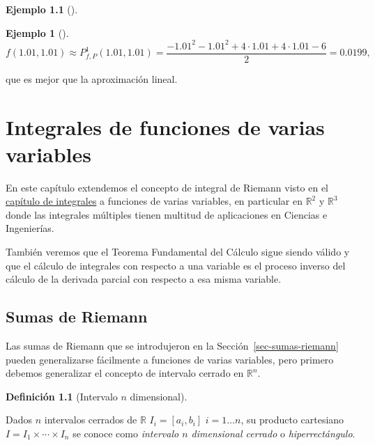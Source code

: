 \documentclass[
  a4paper,
]{scrreport}
\theoremstyle{definition}
\newtheorem{example}{Ejemplo}[chapter]
\theoremstyle{plain}
\theoremstyle{definition}
\newtheorem{definition}{Definición}[chapter]
\theoremstyle{definition}
\theoremstyle{plain}
\theoremstyle{plain}
\theoremstyle{remark}
\begin{document}
\begin{example}[]
\begin{example}[]
\[
f(1.01,1.01) \approx P^1_{f,P}(1.01,1.01) = \frac{-1.01^2-1.01^2+4\cdot 1.01+4\cdot 1.01-6}{2} = 0.0199,
\]

que es mejor que la aproximación lineal.

\end{example}


\chapter{Integrales de funciones de varias
variables}\label{integrales-de-funciones-de-varias-variables}

En este capítulo extendemos el concepto de integral de Riemann visto en
el \href{09-integrales.qmd}{capítulo de integrales} a funciones de
varias variables, en particular en \(\mathbb{R}^2\) y \(\mathbb{R}^3\)
donde las integrales múltiples tienen multitud de aplicaciones en
Ciencias e Ingenierías.

También veremos que el Teorema Fundamental del Cálculo sigue siendo
válido y que el cálculo de integrales con respecto a una variable es el
proceso inverso del cálculo de la derivada parcial con respecto a esa
misma variable.

\section{Sumas de Riemann}\label{sumas-de-riemann}

Las sumas de Riemann que se introdujeron en la
Sección~\ref{sec-sumas-riemann} pueden generalizarse fácilmente a
funciones de varias variables, pero primero debemos generalizar el
concepto de intervalo cerrado en \(\mathbb{R}^n\).

\begin{definition}[Intervalo \(n\)
dimensional]\protect\hypertarget{def-intervalo-n-dimensional-cerrado}{}\label{def-intervalo-n-dimensional-cerrado}

Dados \(n\) intervalos cerrados de \(\mathbb{R}\) \(I_i=[a_i,b_i]\)
\(i=1\ldots n\), su producto cartesiano
\(I = I_1\times \cdots \times I_n\) se conoce como \emph{intervalo \(n\)
dimensional cerrado} o \emph{hiperrectángulo}.

\end{definition}

\begin{tcolorbox}[enhanced jigsaw, leftrule=.75mm, colbacktitle=quarto-callout-note-color!10!white, toprule=.15mm, opacityback=0, opacitybacktitle=0.6, toptitle=1mm, breakable, bottomtitle=1mm, colframe=quarto-callout-note-color-frame, rightrule=.15mm, titlerule=0mm, title=\textcolor{quarto-callout-note-color}{\faInfo}\hspace{0.5em}{Nota}, arc=.35mm, left=2mm, bottomrule=.15mm, colback=white, coltitle=black]


\end{tcolorbox}
\end{example}
\end{document}
